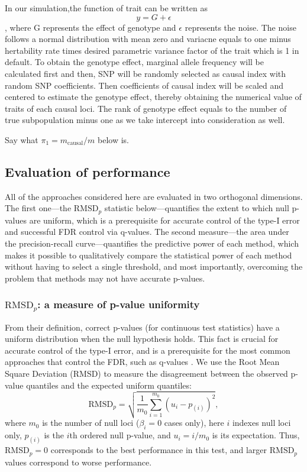 \documentclass[12pt]{article}
\newcommand{\rmsd}{\text{RMSD}_p}
\begin{document}
In our simulation,the function of trait can be written as $$y=G+ \epsilon$$ 
, where G represents the effect of genotype and $\epsilon$ represents the noise.
The noise follows a normal distribution with mean zero and variacne equals to one minus hertability rate times desired parametric variance factor of the trait which is 1 in default.
To obtain the genotype effect, marginal allele frequency will be calculated first and then, SNP will be randomly selected as causal index with random SNP coefficients.
Then  coefficients of causal index will be scaled and centered to estimate the genotype effect, thereby obtaining the numerical value of traits of each causal loci.
The rank of genotype effect equals to the number of true subpopulation minus one as we take intercept into consideration as well.  

Say what $\pi_1 = m_\text{causal} / m$ below is.

\subsection{Evaluation of performance}

All of the approaches considered here are evaluated in two orthogonal dimensions.
The first one---the $\rmsd$ statistic below---quantifies the extent to which null p-values are uniform, which is a prerequisite for accurate control of the type-I error and successful FDR control via q-values.
The second measure---the area under the precision-recall curve---quantifies the predictive power of each method, which makes it possible to qualitatively compare the statistical power of each method without having to select a single threshold, and most importantly, overcoming the problem that methods may not have accurate p-values.

\subsubsection{$\rmsd$: a measure of p-value uniformity}

From their definition, correct p-values (for continuous test statistics) have a uniform distribution when the null hypothesis holds.
This fact is crucial for accurate control of the type-I error, and is a prerequisite for the most common approaches that control the FDR, such as q-values \citep{storey_positive_2003, storey_statistical_2003}.
We use the Root Mean Square Deviation (RMSD) to measure the disagreement between the observed p-value quantiles and the expected uniform quantiles:
$$
\rmsd
=
\sqrt{ \frac{1}{m_0} \sum_{i = 1}^{m_0} \left( u_i - p_{(i)} \right)^2 },
$$
where
$m_0$ is the number of null loci ($\beta_i = 0$ cases only),
here $i$ indexes null loci only,
$p_{(i)}$ is the $i$th ordered null p-value, and
$u_i = i / m_0$ is its expectation.
Thus, $\rmsd = 0$ corresponds to the best performance in this test, and larger $\rmsd$ values correspond to worse performance.
\end{document}

